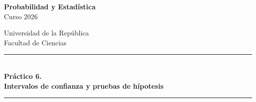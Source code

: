 \documentclass[12pt]{article}
\begin{document}
\begin{center}
\begin{minipage}{0.48\textwidth}
\textbf{Probabilidad y Estad\'istica}\\[2pt]
Curso 2026
\end{minipage}\hfill
\begin{minipage}{0.48\textwidth}
\raggedleft
Universidad de la Rep\'ublica\\[2pt]
Facultad de Ciencias
\end{minipage}
\end{center}

\vspace{1.2em}
\begin{center}
\rule{\textwidth}{0.4pt}\\[0.7em]
{\LARGE\bfseries Pr\'actico 6.}\\[0.4em]
{\large\bfseries Intervalos de confianza y pruebas de h\'ipotesis}\\[0.7em]
\rule{\textwidth}{0.4pt}
\end{center}
\vspace{1.6em}
\end{document}
